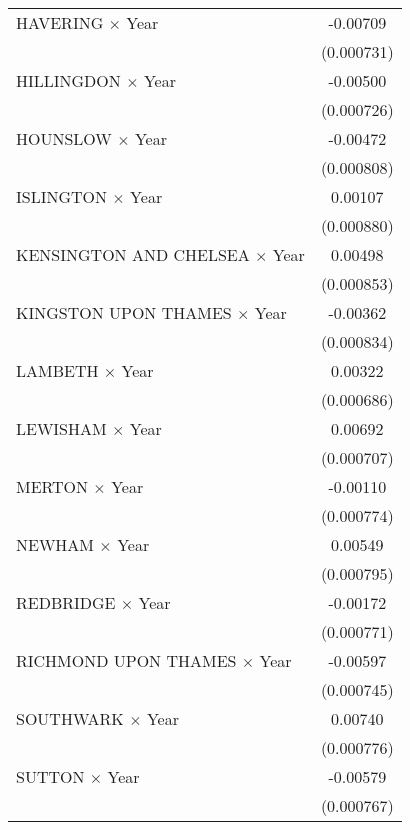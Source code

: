 {\begin{longtable}{l*{1}{c}}
\addlinespace
HAVERING $\times$ Year&    -0.00709\sym{***}\\
                    &  (0.000731)         \\
\addlinespace
HILLINGDON $\times$ Year&    -0.00500\sym{***}\\
                    &  (0.000726)         \\
\addlinespace
HOUNSLOW $\times$ Year&    -0.00472\sym{***}\\
                    &  (0.000808)         \\
\addlinespace
ISLINGTON $\times$ Year&     0.00107         \\
                    &  (0.000880)         \\
\addlinespace
KENSINGTON AND CHELSEA $\times$ Year&     0.00498\sym{***}\\
                    &  (0.000853)         \\
\addlinespace
KINGSTON UPON THAMES $\times$ Year&    -0.00362\sym{***}\\
                    &  (0.000834)         \\
\addlinespace
LAMBETH $\times$ Year&     0.00322\sym{***}\\
                    &  (0.000686)         \\
\addlinespace
LEWISHAM $\times$ Year&     0.00692\sym{***}\\
                    &  (0.000707)         \\
\addlinespace
MERTON $\times$ Year&    -0.00110         \\
                    &  (0.000774)         \\
\addlinespace
NEWHAM $\times$ Year&     0.00549\sym{***}\\
                    &  (0.000795)         \\
\addlinespace
REDBRIDGE $\times$ Year&    -0.00172\sym{*}  \\
                    &  (0.000771)         \\
\addlinespace
RICHMOND UPON THAMES $\times$ Year&    -0.00597\sym{***}\\
                    &  (0.000745)         \\
\addlinespace
SOUTHWARK $\times$ Year&     0.00740\sym{***}\\
                    &  (0.000776)         \\
\addlinespace
SUTTON $\times$ Year&    -0.00579\sym{***}\\
                    &  (0.000767)         \\

\end{longtable}}
